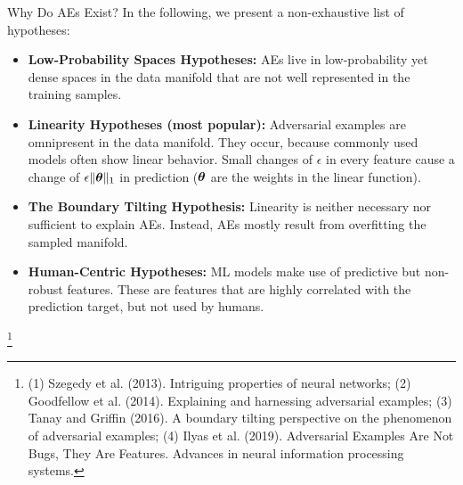 \documentclass[11pt,compress,t,notes=noshow, aspectratio=169, xcolor=table]{beamer}
\begin{document}
\begin{vbframe}{Why Do AEs Exist?}
In the following, we present a non-exhaustive list of hypotheses:
\begin{itemize}
    \item \textbf{Low-Probability Spaces Hypotheses:} AEs live in low-probability yet dense spaces in the data manifold that are not well represented in the training samples.
    \item \textbf{Linearity Hypotheses (most popular):} Adversarial examples are omnipresent in the data manifold. They occur, because commonly used models often show linear behavior. Small changes of $\epsilon$ in every feature cause a change of $\epsilon\|\thetab\|_1$ in prediction ($\thetab$ are the weights in the linear function).
    \item \textbf{The Boundary Tilting Hypothesis:} Linearity is neither necessary nor sufficient to explain AEs. Instead, AEs mostly result from overfitting the sampled manifold.
    \item \textbf{Human-Centric Hypotheses:} ML models make use of predictive but non-robust features. These are features that are highly correlated with the prediction target, but not used by humans.
\end{itemize}
\vspace{-0.2cm}
\footnote[frame]{(1) Szegedy et al. (2013). Intriguing properties of neural networks; (2) Goodfellow et al. (2014). Explaining and harnessing adversarial examples; (3) Tanay and Griffin (2016). A boundary tilting perspective on the phenomenon of adversarial examples; (4) Ilyas et al. (2019). Adversarial Examples Are Not Bugs, They Are Features. Advances in neural information processing systems.}
\end{vbframe}
\end{document}
